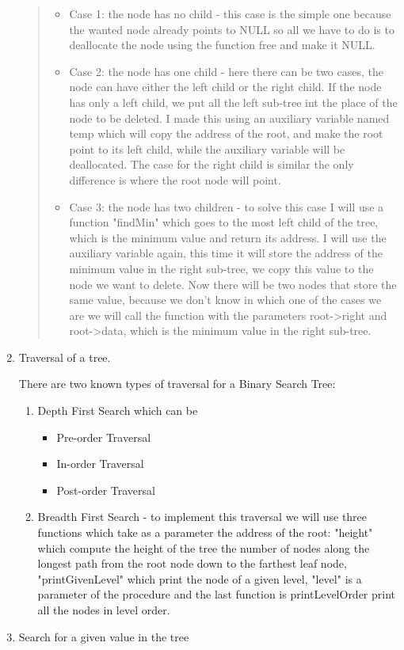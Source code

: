 \documentclass{article}
\begin{document}
\begin{enumerate}
\begin{quotation}
\begin{itemize}
\item Case 1: the node has no child - this case is the simple one because the wanted node already points to NULL so all we have to do is to deallocate the node using the function free and make it NULL.
\item Case 2: the node has one child - here there can be two cases, the node can have either the left child or the right child. If the node has only a left child, we put all the left sub-tree int the place of the node to be deleted. I made this using an auxiliary variable named temp which will copy the address of the root, and make the root point to its left child, while the auxiliary variable will be deallocated. The case for the right child is similar the only difference is where the root node will point.
\item Case 3: the node has two children - to solve this case I will use a function "findMin" which goes to the most left child of the tree, which is the minimum value and return its address. I will use the auxiliary variable again, this time it will store the address of the minimum value in the right sub-tree, we copy this value to the node we want to delete. Now there will be two nodes that store the same value, because we don't know in which one of the cases we are we will call the function with the parameters root->right and root->data, which is the minimum value in the right sub-tree.
\end{itemize}
\end{quotation}
\item Traversal of a tree.

There are two known types of traversal for a Binary Search Tree:
\begin{enumerate}
    \item Depth First Search which can be
        \begin{itemize}
            \item Pre-order Traversal 
            \item In-order Traversal
            \item Post-order Traversal
        \end{itemize}
            
    \item Breadth First Search - to implement this traversal we will use three functions which take as a parameter the address of the root: "height" which compute the height of the tree the number of
    nodes along the longest path from the root node
    down to the farthest leaf node, "printGivenLevel" which print the node of a given level, "level" is a parameter of the procedure and the last function is printLevelOrder print all the nodes in level order.
\end{enumerate}
\item Search for a given value in the tree 


\end{enumerate}
\end{document}
